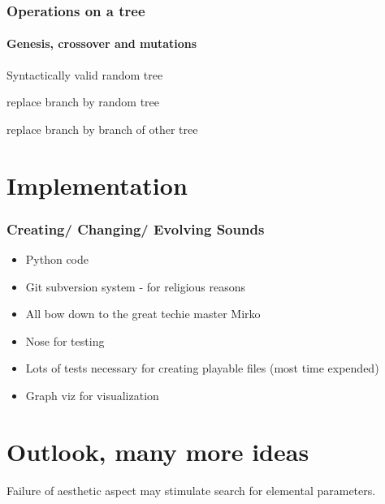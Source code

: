 \documentclass{beamer}
\begin{document}
\begin{frame}
	\frametitle{Operations on a tree}
	\framesubtitle{Genesis, crossover and mutations}
	\begin{description}
		\item<1->[Genesis] Syntactically valid random tree
		\item<2->[Mutation] replace branch by random tree
		\item<3->[Crossover] replace branch by branch of other tree
	\end{description}
\end{frame}




\section{Implementation} %
\begin{frame}
	\frametitle{Creating/ Changing/ Evolving Sounds}
	\begin{itemize}
	\item<1-> Python code 
	\item<2-> Git subversion system - for religious reasons
	\item<3-> All bow down to the great techie master Mirko
	\item<4-> Nose for testing 
	\item<5-> Lots of tests necessary for creating playable files (most time expended)
	\item<6-> Graph viz for visualization
         \end{itemize}

\end{frame}


\label{sg:sec:imple}




\section{Outlook, many more ideas} %
\label{sg:sec:outlook_many_more_ideas}

 Failure of aesthetic aspect may stimulate search for elemental parameters.




\end{document}
